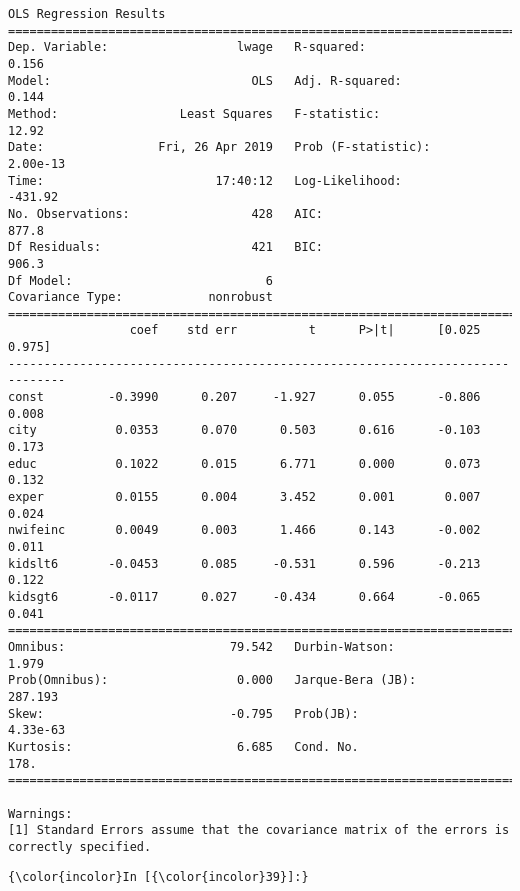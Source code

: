 \documentclass[11pt]{article}
\begin{document}
    \begin{Verbatim}[commandchars=\\\{\}]
                            OLS Regression Results                            
==============================================================================
Dep. Variable:                  lwage   R-squared:                       0.156
Model:                            OLS   Adj. R-squared:                  0.144
Method:                 Least Squares   F-statistic:                     12.92
Date:                Fri, 26 Apr 2019   Prob (F-statistic):           2.00e-13
Time:                        17:40:12   Log-Likelihood:                -431.92
No. Observations:                 428   AIC:                             877.8
Df Residuals:                     421   BIC:                             906.3
Df Model:                           6                                         
Covariance Type:            nonrobust                                         
==============================================================================
                 coef    std err          t      P>|t|      [0.025      0.975]
------------------------------------------------------------------------------
const         -0.3990      0.207     -1.927      0.055      -0.806       0.008
city           0.0353      0.070      0.503      0.616      -0.103       0.173
educ           0.1022      0.015      6.771      0.000       0.073       0.132
exper          0.0155      0.004      3.452      0.001       0.007       0.024
nwifeinc       0.0049      0.003      1.466      0.143      -0.002       0.011
kidslt6       -0.0453      0.085     -0.531      0.596      -0.213       0.122
kidsgt6       -0.0117      0.027     -0.434      0.664      -0.065       0.041
==============================================================================
Omnibus:                       79.542   Durbin-Watson:                   1.979
Prob(Omnibus):                  0.000   Jarque-Bera (JB):              287.193
Skew:                          -0.795   Prob(JB):                     4.33e-63
Kurtosis:                       6.685   Cond. No.                         178.
==============================================================================

Warnings:
[1] Standard Errors assume that the covariance matrix of the errors is correctly specified.

    \end{Verbatim}

    \begin{Verbatim}[commandchars=\\\{\}]
{\color{incolor}In [{\color{incolor}39}]:} 
\end{Verbatim}
\end{document}

